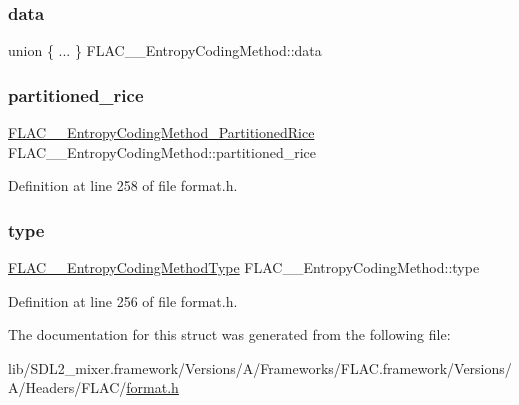 \subsubsection{\texorpdfstring{data}{data}}
{\footnotesize\ttfamily union \{ ... \}   F\+L\+A\+C\+\_\+\+\_\+\+Entropy\+Coding\+Method\+::data}

\mbox{\label{struct_f_l_a_c_____entropy_coding_method_a41d493a19d5c01ec7a06a5b3d83adf8b}} 
\subsubsection{\texorpdfstring{partitioned\_rice}{partitioned\_rice}}
{\footnotesize\ttfamily \mbox{\hyperlink{struct_f_l_a_c_____entropy_coding_method___partitioned_rice}{F\+L\+A\+C\+\_\+\+\_\+\+Entropy\+Coding\+Method\+\_\+\+Partitioned\+Rice}} F\+L\+A\+C\+\_\+\+\_\+\+Entropy\+Coding\+Method\+::partitioned\+\_\+rice}



Definition at line 258 of file format.\+h.

\mbox{\label{struct_f_l_a_c_____entropy_coding_method_abe41e84858fd130777b7cc3c27e400f8}} 
\subsubsection{\texorpdfstring{type}{type}}
{\footnotesize\ttfamily \mbox{\hyperlink{group__flac__format_ga951733d2ea01943514290012cd622d3a}{F\+L\+A\+C\+\_\+\+\_\+\+Entropy\+Coding\+Method\+Type}} F\+L\+A\+C\+\_\+\+\_\+\+Entropy\+Coding\+Method\+::type}



Definition at line 256 of file format.\+h.



The documentation for this struct was generated from the following file\+:\begin{DoxyCompactItemize}
\item 
lib/\+S\+D\+L2\+\_\+mixer.\+framework/\+Versions/\+A/\+Frameworks/\+F\+L\+A\+C.\+framework/\+Versions/\+A/\+Headers/\+F\+L\+A\+C/\mbox{\hyperlink{format_8h}{format.\+h}}\end{DoxyCompactItemize}
